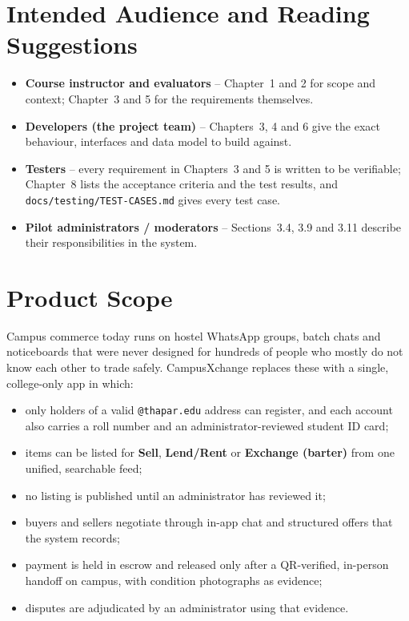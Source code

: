 \documentclass[11pt,a4paper]{scrreprt}
\begin{document}
\section{Intended Audience and Reading Suggestions}
\begin{itemize}
  \item \textbf{Course instructor and evaluators} -- Chapter~1 and 2 for scope
    and context; Chapter~3 and 5 for the requirements themselves.
  \item \textbf{Developers (the project team)} -- Chapters~3, 4 and 6 give the
    exact behaviour, interfaces and data model to build against.
  \item \textbf{Testers} -- every requirement in Chapters~3 and 5 is written
    to be verifiable; Chapter~8 lists the acceptance criteria and the test
    results, and \texttt{docs/testing/TEST-CASES.md} gives every test case.
  \item \textbf{Pilot administrators / moderators} -- Sections~3.4, 3.9 and
    3.11 describe their responsibilities in the system.
\end{itemize}

\section{Product Scope}
Campus commerce today runs on hostel WhatsApp groups, batch chats and
noticeboards that were never designed for hundreds of people who mostly do
not know each other to trade safely. CampusXchange replaces these with a
single, college-only app in which:
\begin{itemize}
  \item only holders of a valid \texttt{@thapar.edu} address can register,
    and each account also carries a roll number and an administrator-reviewed
    student ID card;
  \item items can be listed for \textbf{Sell}, \textbf{Lend/Rent} or
    \textbf{Exchange (barter)} from one unified, searchable feed;
  \item no listing is published until an administrator has reviewed it;
  \item buyers and sellers negotiate through in-app chat and structured
    offers that the system records;
  \item payment is held in escrow and released only after a QR-verified,
    in-person handoff on campus, with condition photographs as evidence;
  \item disputes are adjudicated by an administrator using that evidence.
\end{itemize}
\end{document}
